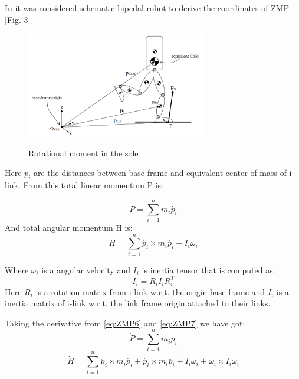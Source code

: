 \documentclass[12pt,a4paper]{report}
\begin{document}
		In \cite{dekker2009zero} it was considered schematic bipedal robot to derive the coordinates of ZMP [Fig. 3]

		\begin{figure}[h!]
			\vspace{-0.2cm}
			\centering
			{\includegraphics[width=0.7\textwidth]{3}}
			\caption{Rotational moment in the sole \cite{dekker2009zero}}
			\label{fig:3}
			\vspace{-0.1cm}
		\end{figure}

		Here $p_i$ are the distances between base frame and equivalent center of mass of i-link. From this total linear momentum P is:
	
		\begin{equation} \label{eq:ZMP6}
			P = \sum^n_{i=1}{m_i \dot{p_i}}
		\end{equation}
		And total angular momentum H is:
		\begin{equation} \label{eq:ZMP7}
			H = \sum^n_{i=1}{\dot{p_i} \times m_i \dot{p_i} + I_i \omega_i}
		\end{equation}

		Where $\omega_i$ is a angular velocity and $I_i$ is inertia tensor that is computed as:
		\begin{equation} \label{eq:ZMP8}
			I_i = R_i I_i R_i^T
		\end{equation}
		Here $R_i$ is a rotation matrix from i-link w.r.t. the origin base frame and $I_i$ is a inertia matrix of i-link w.r.t. the link frame origin attached to their links.

		Taking the derivative from \ref{eq:ZMP6} and \ref{eq:ZMP7} we have got:
		\begin{equation} \label{eq:ZMP9}
			\dot{P} = \sum^n_{i=1}{m_i \ddot{p_i}}
		\end{equation}
		\begin{equation} \label{eq:ZMP10}
			\dot{H} = \sum^n_{i=1}{\ddot{p_i} \times m_i \dot{p_i} + \dot{p_i} \times m_i \ddot{p_i} + I_i \dot{\omega_i}} + \omega_i \times I_i \omega_i
		\end{equation}
\end{document}
